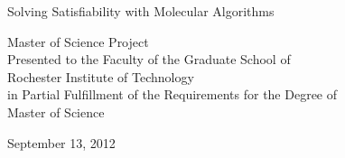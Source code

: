 \begin{titlepage}

	\begin{center}
	
		{\LARGE Solving {\sc Satisfiability} with Molecular Algorithms}\\[1.5cm]

		\vspace{1cm}
		
{\large Master of Science Project}\\
				\vspace{0.5cm}
Presented to the Faculty of the Graduate School of\\
		\vspace{0.5cm}				
Rochester Institute of Technology\\
		\vspace{0.5cm}
in Partial Fulfillment of the Requirements for the Degree of\\
		\vspace{0.5cm}
{\large Master of Science}
		
		\vspace{1cm}
				
		{\large September 13, 2012}
	
	\end{center}

\end{titlepage}